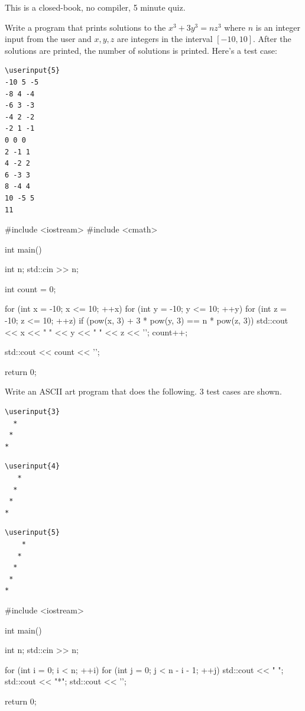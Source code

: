

This is a closed-book, no compiler, 5 minute quiz.

\nextq
Write a program that prints solutions to
the $x^3 + 3y^3 = nz^3$ where
$n$ is an integer input from the user and
$x,y,z$ are integers in the interval $[-10, 10]$.
After the solutions are printed, the number of solutions is printed.
Here's a test case:
\begin{Verbatim}[frame=single,fontsize=\footnotesize,commandchars=\\\{\}]
\userinput{5}
-10 5 -5
-8 4 -4
-6 3 -3
-4 2 -2
-2 1 -1
0 0 0
2 -1 1
4 -2 2
6 -3 3
8 -4 4
10 -5 5
11
\end{Verbatim}
\ANSWER
\begin{answercode}
#include <iostream>
#include <cmath>

int main()
{
    int n;
    std::cin >> n;

    int count = 0;

    for (int x = -10; x <= 10; ++x)
    {
        for (int y = -10; y <= 10; ++y)
        {
            for (int z = -10; z <= 10; ++z)
            {
                if (pow(x, 3) + 3 * pow(y, 3) == n * pow(z, 3))
                {
                    std::cout << x << " " << y << " " << z << '\n'; 
                    count++;
                }
            }
        }
    }

    std::cout << count << '\n';

    return 0;
}

\end{answercode}

\nextq
Write an ASCII art program that does the following.
3 test cases are shown.
\begin{Verbatim}[frame=single,fontsize=\footnotesize,commandchars=\\\{\}]
\userinput{3}
  *
 *
*
\end{Verbatim}
\begin{Verbatim}[frame=single,fontsize=\footnotesize,commandchars=\\\{\}]
\userinput{4}
   *
  *
 *
*
\end{Verbatim}
\begin{Verbatim}[frame=single,fontsize=\footnotesize,commandchars=\\\{\}]
\userinput{5}
    *
   *
  *
 *
*
\end{Verbatim}
\ANSWER
\begin{answercode}
#include <iostream>

int main()
{
    int n;
    std::cin >> n;

    for (int i = 0; i < n; ++i)
    {
        for (int j = 0; j < n - i - 1; ++j)
        {
            std::cout << " ";
        }
        std::cout << "*";
        std::cout << '\n';
    }

    return 0;
}
\end{answercode}



